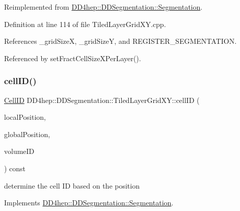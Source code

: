 Reimplemented from \hyperlink{class_d_d4hep_1_1_d_d_segmentation_1_1_segmentation_ac2119ba64c9805751e08b6100ef6fee6}{D\+D4hep\+::\+D\+D\+Segmentation\+::\+Segmentation}.



Definition at line 114 of file Tiled\+Layer\+Grid\+X\+Y.\+cpp.



References \+\_\+grid\+SizeX, \+\_\+grid\+SizeY, and R\+E\+G\+I\+S\+T\+E\+R\+\_\+\+S\+E\+G\+M\+E\+N\+T\+A\+T\+I\+ON.



Referenced by set\+Fract\+Cell\+Size\+X\+Per\+Layer().

\hypertarget{class_d_d4hep_1_1_d_d_segmentation_1_1_tiled_layer_grid_x_y_a4fa76f53ffa685139ce759e3bb9ea1ea}{}\label{class_d_d4hep_1_1_d_d_segmentation_1_1_tiled_layer_grid_x_y_a4fa76f53ffa685139ce759e3bb9ea1ea} 
\subsubsection{\texorpdfstring{cell\+I\+D()}{cellID()}}
{\footnotesize\ttfamily \hyperlink{namespace_d_d4hep_1_1_d_d_segmentation_ac7af071d85cb48820914434a07e21ba1}{Cell\+ID} D\+D4hep\+::\+D\+D\+Segmentation\+::\+Tiled\+Layer\+Grid\+X\+Y\+::cell\+ID (\begin{DoxyParamCaption}\item[{const \hyperlink{struct_d_d4hep_1_1_d_d_segmentation_1_1_vector3_d}{Vector3D} \&}]{local\+Position,  }\item[{const \hyperlink{struct_d_d4hep_1_1_d_d_segmentation_1_1_vector3_d}{Vector3D} \&}]{global\+Position,  }\item[{const \hyperlink{namespace_d_d4hep_1_1_d_d_segmentation_a61a6833a18d1800bdef176595f83e3ba}{Volume\+ID} \&}]{volume\+ID }\end{DoxyParamCaption}) const\hspace{0.3cm}{\ttfamily [virtual]}}



determine the cell ID based on the position 



Implements \hyperlink{class_d_d4hep_1_1_d_d_segmentation_1_1_segmentation_ad5a60953d96d409850d8192f64f8ce3c}{D\+D4hep\+::\+D\+D\+Segmentation\+::\+Segmentation}.



